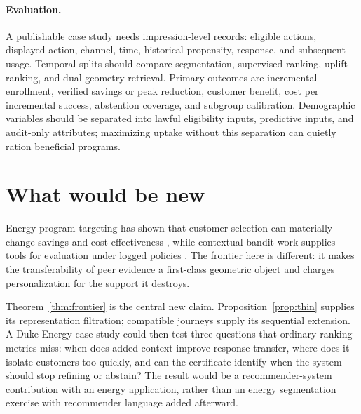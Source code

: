 \documentclass[11pt]{article}
\theoremstyle{noteplain}
\theoremstyle{definition}
\begin{document}
\paragraph{Evaluation.}
A publishable case study needs impression-level records: eligible actions, displayed action, channel, time, historical propensity, response, and subsequent usage.  Temporal splits should compare segmentation, supervised ranking, uplift ranking, and dual-geometry retrieval.  Primary outcomes are incremental enrollment, verified savings or peak reduction, customer benefit, cost per incremental success, abstention coverage, and subgroup calibration.  Demographic variables should be separated into lawful eligibility inputs, predictive inputs, and audit-only attributes; maximizing uptake without this separation can quietly ration beneficial programs.

\section{What would be new}

Energy-program targeting has shown that customer selection can materially change savings and cost effectiveness \cite{jones}, while contextual-bandit work supplies tools for evaluation under logged policies \cite{dudik}.  The frontier here is different: it makes the transferability of peer evidence a first-class geometric object and charges personalization for the support it destroys.

Theorem~\ref{thm:frontier} is the central new claim.  Proposition~\ref{prop:thin} supplies its representation filtration; compatible journeys supply its sequential extension.  A Duke Energy case study could then test three questions that ordinary ranking metrics miss: when does added context improve response transfer, where does it isolate customers too quickly, and can the certificate identify when the system should stop refining or abstain?  The result would be a recommender-system contribution with an energy application, rather than an energy segmentation exercise with recommender language added afterward.
\end{document}
